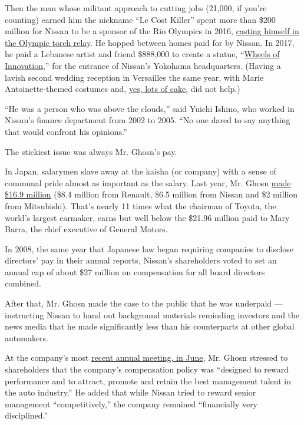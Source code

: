 Then the man whose militant approach to cutting jobs (21,000, if you're
counting) earned him the nickname ``Le Cost Killer'' spent more than
\$200 million for Nissan to be a sponsor of the Rio Olympics in 2016,
\href{https://www.pressreader.com/canada/national-post-latest-edition/20160809/282054801421333}{casting
himself in the Olympic torch relay}. He hopped between homes paid for by
Nissan. In 2017, he paid a Lebanese artist and friend \$888,000 to
create a statue,
``\href{https://www.youtube.com/watch?v=mCLqEI8VURo}{Wheels of
Innovation},'' for the entrance of Nissan's Yokohama headquarters.
(Having a lavish second wedding reception in Versailles the same year,
with Marie Antoinette-themed costumes and,
\href{https://www.townandcountrymag.com/the-scene/weddings/a9634/versailles-wedding/}{yes,
lots of cake}, did not help.)

``He was a person who was above the clouds,'' said Yuichi Ishino, who
worked in Nissan's finance department from 2002 to 2005. ``No one dared
to say anything that would confront his opinions.''

The stickiest issue was always Mr. Ghosn's pay.

In Japan, salarymen slave away at the kaisha (or company) with a sense
of communal pride almost as important as the salary. Last year, Mr.
Ghosn
\href{https://www.reuters.com/article/us-nissan-ghosn-compensation-factbox/factbox-how-carlos-ghosns-pay-compares-with-other-top-auto-executives-idUSKCN1NS0P5}{made
\$16.9 million} (\$8.4 million from Renault, \$6.5 million from Nissan
and \$2 million from Mitsubishi). That's nearly 11 times what the
chairman of Toyota, the world's largest carmaker, earns but well below
the \$21.96 million paid to Mary Barra, the chief executive of General
Motors.

In 2008, the same year that Japanese law began requiring companies to
disclose directors' pay in their annual reports, Nissan's shareholders
voted to set an annual cap of about \$27 million on compensation for all
board directors combined.

After that, Mr. Ghosn made the case to the public that he was underpaid
--- instructing Nissan to hand out background materials reminding
investors and the news media that he made significantly less than his
counterparts at other global automakers.

At the company's most
\href{https://www.youtube.com/watch?v=kTL7yOit6U0\&feature=youtu.be}{recent
annual meeting, in June}, Mr. Ghosn stressed to shareholders that the
company's compensation policy was ``designed to reward performance and
to attract, promote and retain the best management talent in the auto
industry.'' He added that while Nissan tried to reward senior management
``competitively,'' the company remained ``financially very
disciplined.''

